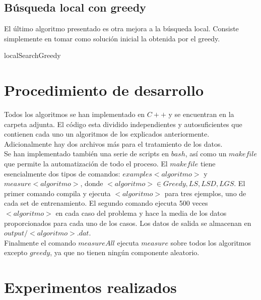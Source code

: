 \documentclass[11pt,a4paper]{article}
\begin{document}
	\subsection{Búsqueda local con greedy}
	
	El último algoritmo presentado es otra mejora a la búsqueda local. Consiste simplemente en tomar como solución inicial la obtenida por el greedy. 
	
	\begin{algorithm}
	\caption{localSearchGreedy}
	\end{algorithm}


	\section{Procedimiento de desarrollo}
	
	Todos los algoritmos se han implementado en $C++$ y se encuentran en la carpeta adjunta. El código esta dividido independientes y autosuficientes que contienen cada uno un algoritmos de los explicados anteriormente. Adicionalmente hay dos archivos más para el tratamiento de los datos. \\
	
	Se han implementado también una serie de scripts en $bash$, así como un $makefile$ que permite la automatización de todo el proceso. El $makefile$ tiene esencialmente dos tipos de comandos: $examples<algoritmo>$ y $measure<algoritmo>$, donde $<algoritmo> \in {Greedy, LS, LSD, LGS}$. El primer comando compila y ejecuta $<algoritmo>$ para tres ejemplos, uno de cada set de entrenamiento. El segundo comando ejecuta 500 veces $<algoritmo>$ en cada caso del problema y hace la media de los datos proporcionados para cada uno de los casos. Los datos de salida se almacenan en $output/<algoritmo>.dat$. \\
	
	Finalmente el comando $measureAll$ ejecuta $measure$ sobre todos los algoritmos excepto $greedy$, ya que no tienen ningún componente aleatorio. \\
	
	\section{Experimentos realizados}
	
\end{document}
